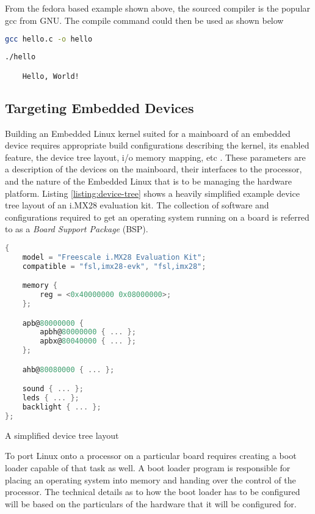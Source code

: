 From the fedora based example shown above, the sourced compiler is the popular gcc from GNU. The compile command could then be used as shown below

\begin{lstlisting}[language=Bash]
	gcc hello.c -o hello
\end{lstlisting}

\begin{lstlisting}[language=Bash]
	./hello

	Hello, World!
\end{lstlisting}


\subsection{Targeting Embedded Devices}

Building an Embedded Linux kernel suited for a mainboard of an embedded device requires appropriate build configurations describing the kernel, its enabled feature, the device tree layout, i/o memory mapping, etc \cite{bootlin-port}. These parameters are a description of the devices on the mainboard, their interfaces to the processor, and the nature of the Embedded Linux that is to be managing the hardware platform. Listing \ref{listing:device-tree} shows a heavily simplified example device tree layout of an i.MX28 evaluation kit. The collection of software and configurations required to get an operating system running on a board is referred to as a \textit{Board Support Package} (BSP).

\begin{lstfloat}
\begin{lstlisting}[language=C]
{
	model = "Freescale i.MX28 Evaluation Kit";
	compatible = "fsl,imx28-evk", "fsl,imx28";

	memory {
		reg = <0x40000000 0x08000000>;
	};

	apb@80000000 {
		apbh@80000000 { ... };
		apbx@80040000 { ... };
	};

	ahb@80080000 { ... };

	sound { ... };
	leds { ... };
	backlight { ... };
};
\end{lstlisting}
\caption{A simplified device tree layout}
\label{listing:device-tree}
\end{lstfloat}

To port Linux onto a processor on a particular board requires creating a boot loader capable of that task as well. A boot loader program is responsible for placing an operating system into memory and handing over the control of the processor. The technical details as to how the boot loader has to be configured will be based on the particulars of the hardware that it will be configured for.

